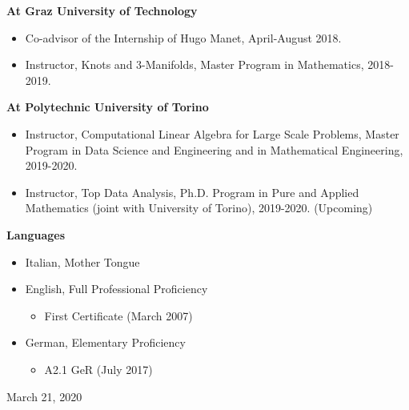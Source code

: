 \documentclass[11pt]{article}
\begin{document}
\vspace*{1ex}
\noindent
{\bf At Graz University of Technology}

\begin{itemize}
  \item Co-advisor of the Internship of Hugo Manet, April-August 2018.
  \item Instructor, Knots and 3-Manifolds, Master Program in Mathematics, 2018-2019.
\end{itemize}

\vspace*{1ex}
\noindent
{\bf At Polytechnic University of Torino}

\begin{itemize}
  \item Instructor, Computational Linear Algebra for Large Scale Problems, Master Program in Data Science and Engineering and in Mathematical Engineering, 2019-2020.
  \item Instructor, Top Data Analysis, Ph.D. Program in Pure and Applied Mathematics (joint with University of Torino), 2019-2020. (Upcoming)
\end{itemize}


\vspace*{2.5ex}
\noindent
{\Large\bf Languages}

\begin{itemize}
\item Italian, Mother Tongue
\item English, Full Professional Proficiency
\begin{itemize}
  \item First Certificate (March 2007)
\end{itemize}
\item German, Elementary Proficiency
\begin{itemize}
  \item A2.1 GeR (July 2017)
\end{itemize}
\end{itemize}


\vspace*{8ex}
\noindent
March 21, 2020

\end{document}

